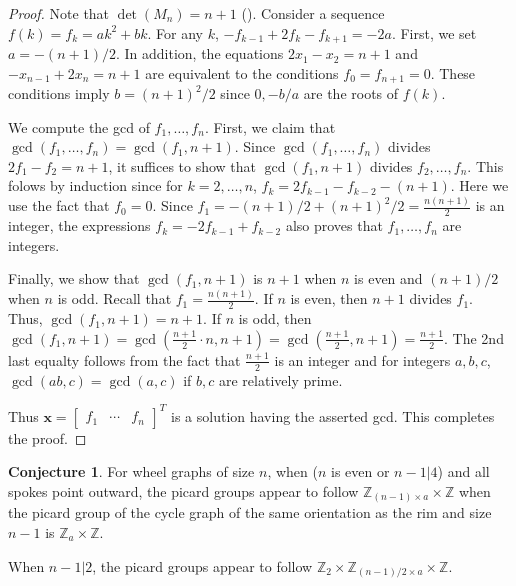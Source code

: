 \documentclass[11pt,reqno]{amsart}
\theoremstyle{definition}
\newtheorem{conj}[mydef]{Conjecture}
\theoremstyle{plain}
\begin{document}
\begin{proof}
Note that $\det (M_n) = n+1$ (). 
Consider a sequence $f(k) = f_k  = ak^2 + bk$. 
For any $k$, $-f_{k-1} + 2f_k - f_{k+1} = -2a$.
First, we set $a = -(n+1)/2$. 
In addition, the equations $2x_1 - x_2 = n+1$ and $-x_{n-1} + 2x_n = n+1$ are equivalent to the conditions $f_0 = f_{n+1} = 0$. 
These conditions imply $b = (n+1)^2/2$ since $0, -b/a$ are the roots of $f(k)$. 

We compute the gcd of $f_1,\dots, f_n$. 
First, we claim that $\gcd(f_1,\dots, f_n) = \gcd(f_1, n+1)$. 
Since $\gcd(f_1,\dots, f_n)$ divides $2f_1-f_2 = n+1$, 
it suffices to show that $\gcd(f_1, n+1)$ divides $f_2,\dots, f_n$. 
This folows by induction since for $k = 2, \dots, n$, 
$f_k = 2 f_{k-1} - f_{k-2} - (n+1)$.
Here we use the fact that $f_0 = 0$. 
Since $f_1 =  -(n+1)/2 + (n+1)^2/2 = \frac{n(n+1)}2$ is an integer, the expressions $f_k = -2 f_{k-1} + f_{k-2}$ also proves that $f_1, \dots, f_n$ are integers. 

Finally, we show that $\gcd(f_1, n+1)$ is $n+1$ when $n$ is even and $(n+1)/2$ when $n$ is odd. 
Recall that $f_1 = \frac{n(n+1)}2$.
If $n$ is even, then $n+1$ divides $f_1$. 
Thus, $\gcd(f_1, n+1) = n+1$. 
If $n$ is odd, then $\gcd(f_1, n+1) = \gcd(\frac{n+1}2 \cdot n, n+1) = \gcd(\frac{n+1}2, n+1) = \frac{n+1}2$. 
The 2nd last equalty follows from the fact that $\frac{n+1}2$ is an integer and for integers $a,b,c$, $\gcd(ab,c) = \gcd(a,c)$ if $b,c$ are relatively prime. 

Thus $\mathbf{x} = \begin{bmatrix} f_1 & \cdots & f_n \end{bmatrix}^T$ is a solution having the asserted gcd. 
This completes the proof. 
\end{proof}

\begin{conj}
	For wheel graphs of size $n$, when ($n$ is even or $n-1 | 4$) and all spokes point outward, the picard groups appear to follow
	$\mathbb{Z}_{(n-1) \times a} \times \mathbb{Z}$ when the picard group of the cycle graph of the same orientation as the rim
	and size $n-1$ is $\mathbb{Z}_a \times \mathbb{Z}$.

	When $n-1 | 2$, the picard groups appear to follow $\mathbb{Z}_2 \times \mathbb{Z}_{(n-1)/2 \times a} \times \mathbb{Z}$.
\end{conj}
\end{document}
